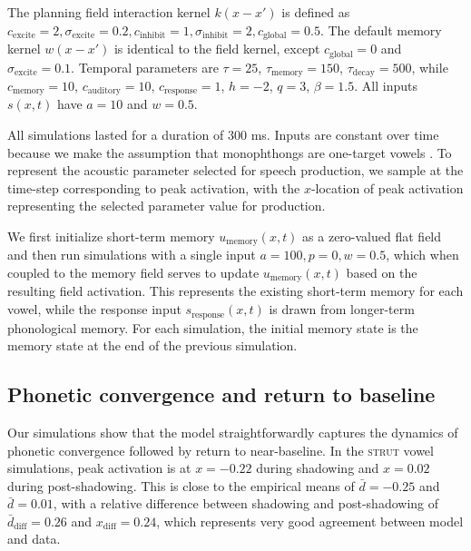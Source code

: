 \documentclass[10pt,letterpaper]{article}
\begin{document}
The planning field interaction kernel $k(x-x')$ is defined as $c_{\text{excite}} = 2, \sigma_{\text{excite}} = 0.2, c_{\text{inhibit}} = 1, \sigma_{\text{inhibit}} = 2, c_{\text{global}} = 0.5$. The default memory kernel $w(x-x')$ is identical to the field kernel, except $c_{\text{global}} = 0$ and $\sigma_{\text{excite}} = 0.1$. Temporal parameters are $\tau = 25$, $\tau_{\text{memory}} = 150$, $\tau_{\text{decay}} = 500$, while $c_{\text{memory}} = 10$, $c_{\text{auditory}} = 10$, $c_{\text{response}} = 1$, $h = -2$, $q = 3$, $\beta=1.5$. All inputs $s(x,t)$ have $a = 10$ and $w = 0.5$.

All simulations lasted for a duration of 300 ms. Inputs are constant over time because we make the assumption that monophthongs are one-target vowels \citep{strycharczuk-etal2024}. To represent the acoustic parameter selected for speech production, we sample at the time-step corresponding to peak activation, with the $x$-location of peak activation representing the selected parameter value for production.

We first initialize short-term memory $u_{\text{memory}}(x,t)$ as a zero-valued flat field and then run simulations with a single input $a =100, p=0, w=0.5$, which when coupled to the memory field serves to update $u_{\text{memory}}(x,t)$ based on the resulting field activation. This represents the existing short-term memory for each vowel, while the response input $s_{\text{response}}(x,t)$ is drawn from longer-term phonological memory. For each simulation, the initial memory state is the memory state at the end of the previous simulation.


\subsection{Phonetic convergence and return to baseline}

Our simulations show that the model straightforwardly captures the dynamics of phonetic convergence followed by return to near-baseline. In the \textsc{strut} vowel simulations, peak activation is at $x = - 0.22$ during shadowing and $x= 0.02$ during post-shadowing. This is close to the empirical means of $\bar{d} = -0.25$ and $\bar{d} = 0.01$, with a relative difference between shadowing and post-shadowing of $\bar{d}_{\text{diff}} = 0.26$ and $ x_{\text{diff}} = 0.24$, which represents very good agreement between model and data.
\end{document}
